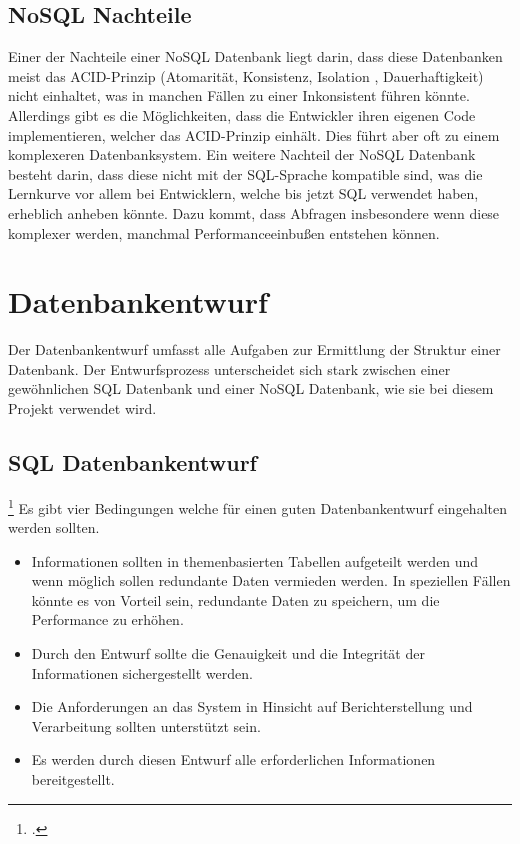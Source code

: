 	\subsection{NoSQL Nachteile}
		Einer der Nachteile einer NoSQL Datenbank liegt darin, dass diese Datenbanken meist das ACID-Prinzip (Atomarität, Konsistenz, Isolation , Dauerhaftigkeit) nicht einhaltet, was in manchen Fällen zu einer Inkonsistent führen könnte. 
		Allerdings gibt es die Möglichkeiten, dass die Entwickler ihren eigenen Code implementieren, welcher das ACID-Prinzip einhält. 
		Dies führt aber oft zu einem komplexeren Datenbanksystem. Ein weitere Nachteil der NoSQL Datenbank besteht darin, dass diese nicht mit der SQL-Sprache kompatible sind, was die Lernkurve vor allem bei Entwicklern, welche bis jetzt SQL verwendet haben, erheblich anheben könnte. 
		Dazu kommt, dass Abfragen insbesondere wenn diese komplexer werden, manchmal Performanceeinbußen entstehen können.
	\section{Datenbankentwurf}
		Der Datenbankentwurf umfasst alle Aufgaben zur Ermittlung der Struktur einer Datenbank. 
		Der Entwurfsprozess unterscheidet sich stark zwischen einer gewöhnlichen SQL Datenbank und einer NoSQL Datenbank, wie sie bei diesem Projekt verwendet wird.		
		\subsection{SQL Datenbankentwurf} \footcite{microsoftsql}
			Es gibt vier Bedingungen welche für einen guten Datenbankentwurf eingehalten werden sollten.
			\begin{itemize}
				\item Informationen sollten in themenbasierten Tabellen aufgeteilt werden und wenn möglich sollen redundante Daten vermieden werden. In speziellen Fällen könnte es von Vorteil sein, redundante Daten zu speichern, um die Performance zu erhöhen.
				\item Durch den Entwurf sollte die Genauigkeit und die Integrität der Informationen sichergestellt werden.
				\item Die Anforderungen an das System in Hinsicht auf Berichterstellung und Verarbeitung sollten unterstützt sein.
				\item Es werden durch diesen Entwurf alle erforderlichen Informationen bereitgestellt. 
			\end{itemize}
